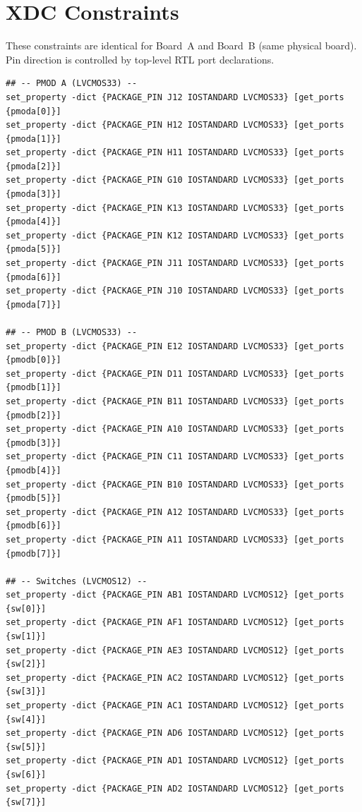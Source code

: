 \documentclass[conference]{IEEEtran}
\begin{document}
\appendix

\section{XDC Constraints}
\label{app:xdc}

These constraints are identical for Board~A and Board~B (same physical board). Pin direction is controlled by top-level RTL port declarations.

\begin{lstlisting}
## -- PMOD A (LVCMOS33) --
set_property -dict {PACKAGE_PIN J12 IOSTANDARD LVCMOS33} [get_ports {pmoda[0]}]
set_property -dict {PACKAGE_PIN H12 IOSTANDARD LVCMOS33} [get_ports {pmoda[1]}]
set_property -dict {PACKAGE_PIN H11 IOSTANDARD LVCMOS33} [get_ports {pmoda[2]}]
set_property -dict {PACKAGE_PIN G10 IOSTANDARD LVCMOS33} [get_ports {pmoda[3]}]
set_property -dict {PACKAGE_PIN K13 IOSTANDARD LVCMOS33} [get_ports {pmoda[4]}]
set_property -dict {PACKAGE_PIN K12 IOSTANDARD LVCMOS33} [get_ports {pmoda[5]}]
set_property -dict {PACKAGE_PIN J11 IOSTANDARD LVCMOS33} [get_ports {pmoda[6]}]
set_property -dict {PACKAGE_PIN J10 IOSTANDARD LVCMOS33} [get_ports {pmoda[7]}]

## -- PMOD B (LVCMOS33) --
set_property -dict {PACKAGE_PIN E12 IOSTANDARD LVCMOS33} [get_ports {pmodb[0]}]
set_property -dict {PACKAGE_PIN D11 IOSTANDARD LVCMOS33} [get_ports {pmodb[1]}]
set_property -dict {PACKAGE_PIN B11 IOSTANDARD LVCMOS33} [get_ports {pmodb[2]}]
set_property -dict {PACKAGE_PIN A10 IOSTANDARD LVCMOS33} [get_ports {pmodb[3]}]
set_property -dict {PACKAGE_PIN C11 IOSTANDARD LVCMOS33} [get_ports {pmodb[4]}]
set_property -dict {PACKAGE_PIN B10 IOSTANDARD LVCMOS33} [get_ports {pmodb[5]}]
set_property -dict {PACKAGE_PIN A12 IOSTANDARD LVCMOS33} [get_ports {pmodb[6]}]
set_property -dict {PACKAGE_PIN A11 IOSTANDARD LVCMOS33} [get_ports {pmodb[7]}]

## -- Switches (LVCMOS12) --
set_property -dict {PACKAGE_PIN AB1 IOSTANDARD LVCMOS12} [get_ports {sw[0]}]
set_property -dict {PACKAGE_PIN AF1 IOSTANDARD LVCMOS12} [get_ports {sw[1]}]
set_property -dict {PACKAGE_PIN AE3 IOSTANDARD LVCMOS12} [get_ports {sw[2]}]
set_property -dict {PACKAGE_PIN AC2 IOSTANDARD LVCMOS12} [get_ports {sw[3]}]
set_property -dict {PACKAGE_PIN AC1 IOSTANDARD LVCMOS12} [get_ports {sw[4]}]
set_property -dict {PACKAGE_PIN AD6 IOSTANDARD LVCMOS12} [get_ports {sw[5]}]
set_property -dict {PACKAGE_PIN AD1 IOSTANDARD LVCMOS12} [get_ports {sw[6]}]
set_property -dict {PACKAGE_PIN AD2 IOSTANDARD LVCMOS12} [get_ports {sw[7]}]


\end{lstlisting}
\end{document}
